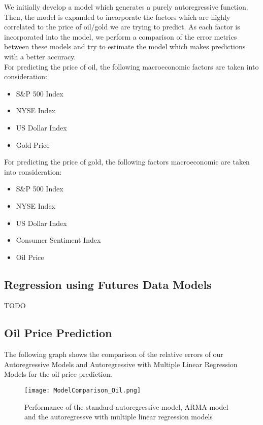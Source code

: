 \documentclass[runningheads]{llncs}
\begin{document}
\noindent We initially develop a model which generates a purely autoregressive function. Then, the model is expanded to incorporate the factors which are highly correlated to the price of oil/gold we are trying to predict. As each factor is incorporated into the model, we perform a comparison of the error metrics between these models and try to estimate the model which makes predictions with a better accuracy.\\

\noindent For predicting the price of oil, the following macroeconomic factors are taken into consideration:
\begin {itemize}
\item S\&P 500 Index
\item NYSE Index
\item US Dollar Index
\item Gold Price
\end {itemize}

\noindent For predicting the price of gold, the following factors macroeconomic are taken into consideration:
\begin {itemize}
\item S\&P 500 Index
\item NYSE Index
\item US Dollar Index
\item Consumer Sentiment Index
\item Oil Price
\end {itemize}

\subsection{Regression using Futures Data Models}
TODO

\subsection{Oil Price Prediction}
The following graph shows the comparison of the relative errors of our Autoregressive Models and Autoregressive with Multiple Linear Regression Models for the oil price prediction.

\begin{figure}
\centering
\texttt{[image: ModelComparison\_Oil.png]}
\caption{Performance of the standard autoregressive model, ARMA model and the autoregressve with multiple linear regression models}
\label{fig:ModelComparison_Oil.png}
\end{figure}
\end{document}
